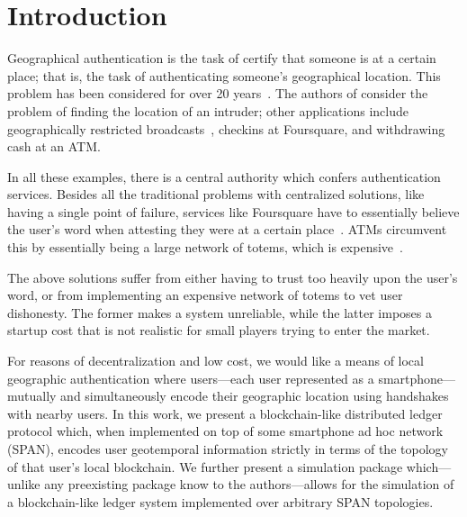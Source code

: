 \section{Introduction}

Geographical authentication
is the task of certify that someone is at a certain place;
that is,
the task of authenticating someone's geographical location.
This problem has been considered for over 20 years~\cite{denning_1996}.
The authors of \cite{denning_1996} consider the problem of finding
the location of an intruder;
other applications include geographically restricted broadcasts~\cite{gdpr},
checkins at Foursquare,
and withdrawing cash at an ATM.

In all these examples,
there is a central authority which confers authentication services.
Besides all the traditional problems with centralized solutions,
like having a single point of failure,
services like Foursquare have to essentially believe the user's word
when attesting they were at a certain place~\cite{glas2015breaking}.
ATMs circumvent this by essentially being a large network of totems,
which is expensive~\cite{totem_patent}.

The above solutions suffer from either having to trust too heavily upon
the user's word, or from implementing an expensive network of totems to
vet user dishonesty. The former makes a system unreliable, while the latter
imposes a startup cost that is not realistic for small players trying to enter
the market.

For reasons of decentralization and low cost, we would like a
means of local geographic authentication where users---each user represented as
a smartphone---mutually and simultaneously encode their geographic location using
handshakes with nearby users.
In this work,
we present a blockchain-like distributed ledger protocol which,
when implemented on top of some
smartphone ad hoc network (SPAN), encodes user geotemporal information strictly in
terms of the topology of that user's local blockchain. We further present a simulation
package which---unlike any preexisting package know to the authors---allows for the
simulation of a blockchain-like ledger system implemented over arbitrary SPAN
topologies.
